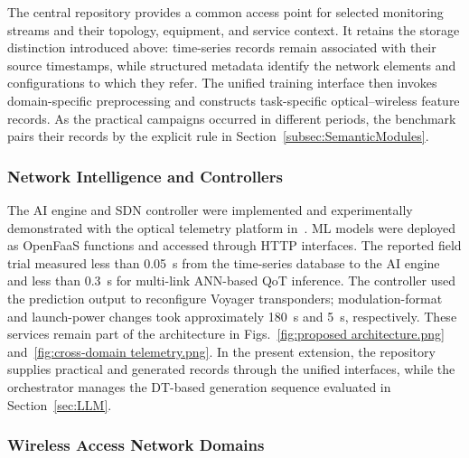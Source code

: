 \documentclass[9pt,twocolumn,twoside]{osajnl}
\begin{document}
The central repository provides a common access point for selected monitoring streams and their topology, equipment, and service context. It retains the storage distinction introduced above: time-series records remain associated with their source timestamps, while structured metadata identify the network elements and configurations to which they refer. The unified training interface then invokes domain-specific preprocessing and constructs task-specific optical--wireless feature records. As the practical campaigns occurred in different periods, the benchmark pairs their records by the explicit rule in Section~\ref{subsec:SemanticModules}.

\subsubsection{Network Intelligence and Controllers}

The AI engine and SDN controller were implemented and experimentally demonstrated with the optical telemetry platform in~\cite{shen2025telemetry}. ML models were deployed as OpenFaaS functions and accessed through HTTP interfaces. The reported field trial measured less than 0.05~s from the time-series database to the AI engine and less than 0.3~s for multi-link ANN-based QoT inference. The controller used the prediction output to reconfigure Voyager transponders; modulation-format and launch-power changes took approximately 180~s and 5~s, respectively. These services remain part of the architecture in Figs.~\ref{fig:proposed architecture.png} and~\ref{fig:cross-domain telemetry.png}. In the present extension, the repository supplies practical and generated records through the unified interfaces, while the orchestrator manages the DT-based generation sequence evaluated in Section~\ref{sec:LLM}.


\subsubsection{Wireless Access Network Domains}
\end{document}

